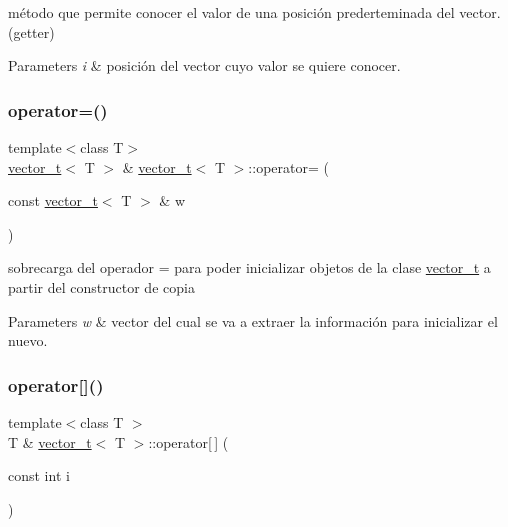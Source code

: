 método que permite conocer el valor de una posición prederteminada del vector. (getter) 


\begin{DoxyParams}{Parameters}
{\em i} & posición del vector cuyo valor se quiere conocer. \\
\hline
\end{DoxyParams}
\mbox{\label{classvector__t_a44ee95cba66ece73a42fae2d8e2ac884}} 
\subsubsection{\texorpdfstring{operator=()}{operator=()}}
{\footnotesize\ttfamily template$<$class T$>$ \\
\hyperlink{classvector__t}{vector\+\_\+t}$<$ T $>$ \& \hyperlink{classvector__t}{vector\+\_\+t}$<$ T $>$\+::operator= (\begin{DoxyParamCaption}\item[{const \hyperlink{classvector__t}{vector\+\_\+t}$<$ T $>$ \&}]{w }\end{DoxyParamCaption})}



sobrecarga del operador = para poder inicializar objetos de la clase \hyperlink{classvector__t}{vector\+\_\+t} a partir del constructor de copia 


\begin{DoxyParams}{Parameters}
{\em w} & vector del cual se va a extraer la información para inicializar el nuevo. \\
\hline
\end{DoxyParams}
\mbox{\label{classvector__t_ab2d9aa719f4c303918deed9360dae846}} 
\subsubsection{\texorpdfstring{operator[]()}{operator[]()}\hspace{0.1cm}{\footnotesize\ttfamily [1/2]}}
{\footnotesize\ttfamily template$<$class T $>$ \\
T \& \hyperlink{classvector__t}{vector\+\_\+t}$<$ T $>$\+::operator\mbox{[}$\,$\mbox{]} (\begin{DoxyParamCaption}\item[{const int}]{i }\end{DoxyParamCaption})}



